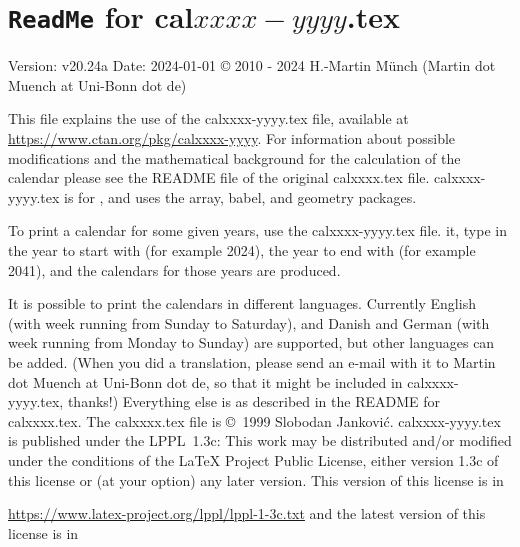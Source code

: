 \documentclass{article}[2023/05/17]%
\begin{document}
\section*{\texttt{ReadMe} for cal$xxxx-yyyy$.tex}
Version: v20.24a\newline
Date: 2024-01-01\newline
© 2010 - 2024 H.-Martin Münch (Martin dot Muench at Uni-Bonn dot de)\newline

\noindent This file explains the use of the \textsf{calxxxx-yyyy.tex} file,
available at\newline
\url{https://www.ctan.org/pkg/calxxxx-yyyy}.\newline
\noindent For information about possible modifications and the mathematical background
for the calculation of the calendar please see the README file of the original
\textsf{calxxxx.tex} file. \textsf{calxxxx-yyyy.tex} is for \LaTeXe, and uses
the \textsf{array}, \textsf{babel}, and \textsf{geometry} packages.

\hspace*{-1.98471pt}To print a calendar for some given years,
use the \textsf{calxxxx-yyyy.tex} file. \LaTeXe{} it, type in the year to start with
(for example 2024), the year to end with (for example 2041), and the calendars
for those years are produced.

It is possible to print the calendars in different languages. Currently
English (with week running from Sunday to Saturday),
and Danish and German (with week running from Monday to Sunday) are supported,
but other languages can be added. (When you did a translation, please send
an e-mail with it to Martin dot Muench at Uni-Bonn dot de,
so that it might be included in \textsf{calxxxx-yyyy.tex}, thanks!)\newline
Everything else is as described in the README for \textsf{calxxxx.tex}.\newline
The \textsf{calxxxx.tex} file is ©~1999 Slobodan Janković.\newline
\textsf{calxxxx-yyyy.tex} is published under the LPPL~1.3c: This work may be
distributed and/or modified under the conditions of the \LaTeX{} Project
Public License, either version 1.3c of this license or (at your option) any
later version. This version of this license is in

\url{https://www.latex-project.org/lppl/lppl-1-3c.txt}\newline
and the latest version of this license is in
\end{document}
